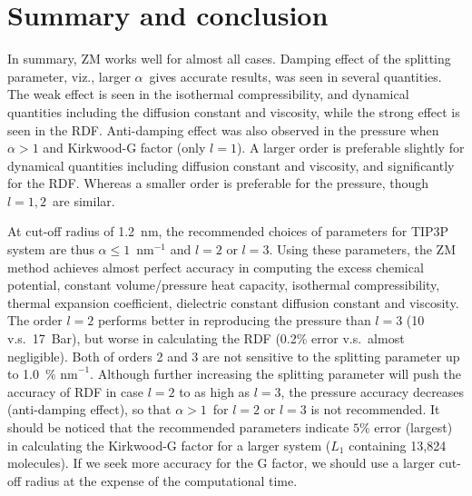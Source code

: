 \documentclass[a4paper,preprint,unsortedaddress,onecolumn,fleqn]{revtex4}
\begin{document}

\section{Summary and conclusion}

In summary, ZM works well for almost all cases. Damping effect of the
splitting parameter, viz., larger $\alpha $\ gives accurate results, was
seen in several quantities. The weak effect is seen in the isothermal
compressibility, {\color{red} } and dynamical quantities including the
diffusion constant and viscosity, while the strong effect is seen in the
RDF. Anti-damping effect was also observed in the pressure when $\alpha >1$
and Kirkwood-G factor (only $l=1$). A larger order is preferable slightly
for dynamical quantities including diffusion constant and viscosity, and
significantly for the RDF. Whereas a smaller order is preferable for the
pressure, though $l=1,2$\ are similar.

At cut-off radius of 1.2~nm, the recommended choices of parameters for TIP3P
system are thus $\alpha \leq 1$~$\text{nm}^{-1}$ and $l=2$ or $l=3$. Using
these parameters, the ZM method achieves almost perfect accuracy in
computing the excess chemical potential, constant volume/pressure heat
capacity, isothermal compressibility, thermal expansion coefficient,
dielectric constant diffusion constant and viscosity. The order $l=2$
performs better in reproducing the pressure than $l=3$ (10 v.s.~17~Bar), but
worse in calculating the RDF (0.2\% error v.s.~almost negligible). Both of
orders 2 and 3 are not sensitive to the splitting parameter up to 1.0~$\text{%
nm}^{-1}$. Although further increasing the splitting parameter will push the
accuracy of RDF in case $l=2 $ to as high as $l=3$, the pressure accuracy
decreases (anti-damping effect), so that $\alpha >1$\ for $l=2$ or $l=3$ is
not recommended. It should be noticed that the recommended parameters
indicate $5$\% error (largest) in calculating the Kirkwood-G factor for a
larger system ($L_{1}$ containing 13,824 molecules). If we seek more
accuracy for the G factor, we should use a larger cut-off radius at the
expense of the computational time. 
\end{document}
